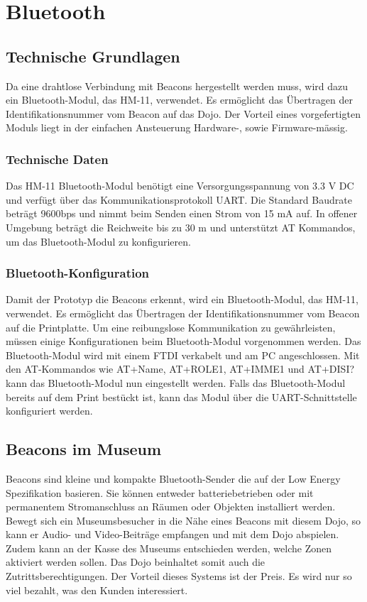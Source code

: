 \chapter{Bluetooth}
\label{Bluetooth}
\thispagestyle{fancy} 
\section{Technische Grundlagen}
Da eine drahtlose Verbindung mit Beacons hergestellt werden muss, wird dazu ein Bluetooth-Modul, das HM-11, verwendet. Es ermöglicht das Übertragen der Identifikationsnummer vom Beacon auf das Dojo. Der Vorteil eines vorgefertigten Moduls liegt in der einfachen Ansteuerung Hardware-, sowie Firmware-mässig.

\subsection*{Technische Daten}
Das HM-11 Bluetooth-Modul benötigt eine Versorgungsspannung von 3.3 V DC und verfügt über das Kommunikationsprotokoll UART. Die Standard Baudrate beträgt 9600bps und nimmt beim Senden einen Strom von 15 mA auf. In offener Umgebung beträgt die Reichweite bis zu 30 m und unterstützt AT Kommandos, um das Bluetooth-Modul zu konfigurieren. 

\subsection*{Bluetooth-Konfiguration}
Damit der Prototyp die Beacons erkennt, wird ein Bluetooth-Modul, das HM-11, verwendet. Es ermöglicht das Übertragen der Identifikationsnummer vom Beacon auf die Printplatte. Um eine reibungslose Kommunikation zu gewährleisten, müssen einige Konfigurationen beim Bluetooth-Modul vorgenommen werden. Das Bluetooth-Modul wird mit einem FTDI verkabelt und am PC angeschlossen. Mit den AT-Kommandos wie AT+Name, AT+ROLE1, AT+IMME1 und AT+DISI? kann das Bluetooth-Modul nun eingestellt werden. Falls das Bluetooth-Modul bereits auf dem Print bestückt ist, kann das Modul über die UART-Schnittstelle konfiguriert werden. 

\section{Beacons im Museum}
Beacons sind kleine und kompakte Bluetooth-Sender die auf der Low Energy Spezifikation basieren. Sie können entweder batteriebetrieben oder mit permanentem Stromanschluss an Räumen oder Objekten installiert werden. Bewegt sich ein Museumsbesucher in die Nähe eines Beacons mit diesem Dojo, so kann er Audio- und Video-Beiträge empfangen und mit dem Dojo abspielen. Zudem kann an der Kasse des Museums entschieden werden, welche Zonen aktiviert werden sollen. Das Dojo beinhaltet somit auch die Zutrittsberechtigungen. Der Vorteil dieses Systems ist der Preis. Es wird nur so viel bezahlt, was den Kunden  interessiert. 


